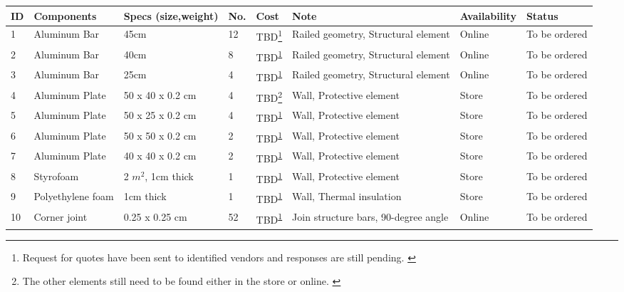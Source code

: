 \begin{longtable}{|m{}|m{}|m{}|m{}|m{}|m{}|m{}|m{}|}
     
   
\hline
\textbf{ID} & \textbf{Components} & \textbf{Specs (size,weight)} & \textbf{No.} & \textbf{Cost} & \textbf{Note} & \textbf{Availability} & \textbf{Status} \\ \hline
1 & Aluminum Bar & 45cm & 12 & TBD\footnote{Request for quotes have been sent to identified vendors and responses are still pending. \label{fn:mechcomp1}} & Railed geometry, Structural element & Online & To be ordered \\ \hline
2 & Aluminum Bar & 40cm & 8 & TBD\textsuperscript{\ref{fn:mechcomp1}} & Railed geometry, Structural element & Online & To be ordered \\ \hline
3 & Aluminum Bar & 25cm & 4 & TBD\textsuperscript{\ref{fn:mechcomp1}} & Railed geometry, Structural element & Online & To be ordered \\ \hline
4 & Aluminum Plate & 50 x 40 x 0.2 cm & 4 & TBD\footnote{The other elements still need to be found either in the store or online. \label{fn:mechcomp2}} & Wall, Protective element & Store & To be ordered \\ \hline
5 & Aluminum Plate & 50 x 25 x 0.2 cm & 4 & TBD\textsuperscript{\ref{fn:mechcomp2}} & Wall, Protective element & Store & To be ordered \\ \hline
6 & Aluminum Plate & 50 x 50 x 0.2 cm & 2 & TBD\textsuperscript{\ref{fn:mechcomp2}} & Wall, Protective element & Store & To be ordered \\ \hline
7 & Aluminum Plate & 40 x 40 x 0.2 cm & 2 & TBD\textsuperscript{\ref{fn:mechcomp2}} & Wall, Protective element & Store & To be ordered \\ \hline
8 & Styrofoam & 2 $m^2$, 1cm thick & 1 & TBD\textsuperscript{\ref{fn:mechcomp2}} & Wall, Protective element & Store & To be ordered \\ \hline
9 & Polyethylene foam & 1cm thick & 1 & TBD\textsuperscript{\ref{fn:mechcomp2}} & Wall, Thermal insulation & Store & To be ordered \\ \hline
10 & Corner joint & 0.25 x 0.25 cm & 52 & TBD\textsuperscript{\ref{fn:mechcomp2}} & Join structure bars, 90-degree angle & Online & To be ordered \\ \hline

\end{longtable}
